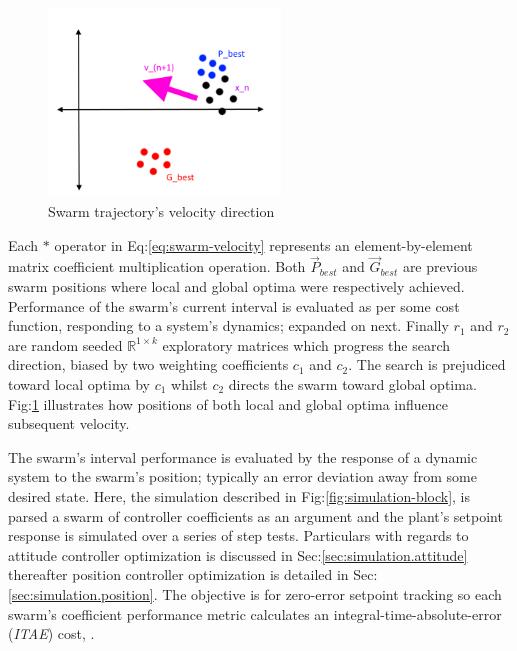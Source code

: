 \par
\begin{figure}[hbtp]
\vspace{-14pt}
\centering
\includegraphics[width=0.55\textwidth]{figs/swarm-trajectory}
\vspace{-10pt}
\caption{Swarm trajectory's velocity direction}
\label{fig:swarm-trajectory}
\vspace{-12pt}
\end{figure}
\par
Each $\ast$ operator in Eq:\ref{eq:swarm-velocity} represents an element-by-element matrix coefficient multiplication operation. Both $\vec{P}_{best}$ and $\vec{G}_{best}$ are previous swarm positions where local and global optima were respectively achieved. Performance of the swarm's current interval is evaluated as per some cost function, responding to a system's dynamics; expanded on next. Finally $r_1$ and $r_2$ are random seeded $\mathbb{R}^{1\times k}$ exploratory matrices which progress the search direction, biased by two weighting coefficients $c_1$ and $c_2$. The search is prejudiced toward local optima by $c_1$ whilst $c_2$ directs the swarm toward global optima. Fig:\ref{fig:swarm-trajectory} illustrates how positions of both local and global optima influence subsequent velocity.
\par
The swarm's interval performance is evaluated by the response of a dynamic system to the swarm's position;  typically an error deviation away from some desired state. Here, the simulation described in Fig:\ref{fig:simulation-block}, is parsed a swarm of controller coefficients as an argument and the plant's setpoint response is simulated over a series of step tests. Particulars with regards to attitude controller optimization is discussed in Sec:\ref{sec:simulation.attitude} thereafter position controller optimization is detailed in Sec:\ref{sec:simulation.position}. The objective is for zero-error setpoint tracking so each swarm's coefficient performance metric calculates an integral-time-absolute-error (\emph{ITAE}) cost, \cite{ITAE}.
